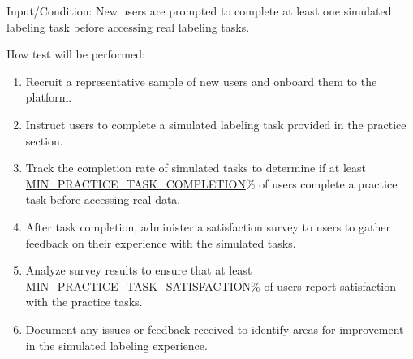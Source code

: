 \documentclass[12pt, titlepage]{article}
\begin{document}
\begin{enumerate}
Input/Condition: New users are prompted to complete at least one simulated labeling task before accessing real labeling tasks.

How test will be performed:
\begin{enumerate}
    \item Recruit a representative sample of new users and onboard them to the platform.
    \item Instruct users to complete a simulated labeling task provided in the practice section.
    \item Track the completion rate of simulated tasks to determine if at least \hyperref[MIN_PRACTICE_TASK_COMPLETION]{MIN\_PRACTICE\_TASK\_COMPLETION}\% of users complete a practice task before accessing real data.
    \item After task completion, administer a satisfaction survey to users to gather feedback on their experience with the simulated tasks.
    \item Analyze survey results to ensure that at least \hyperref[MIN_PRACTICE_TASK_SATISFACTION]{MIN\_PRACTICE\_TASK\_SATISFACTION}\% of users report satisfaction with the practice tasks.
    \item Document any issues or feedback received to identify areas for improvement in the simulated labeling experience.
\end{enumerate}


\end{enumerate}

\end{document}
